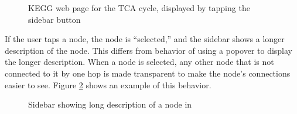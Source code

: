 \begin{figure}[hbtp]
    \caption{\label{fig:kegg_screenshot_kegg_web_site} KEGG web page for the TCA
    cycle, displayed by tapping the sidebar button}
\end{figure}

If the user taps a node, the node is ``selected,'' and the sidebar shows a
longer description of the node.  This differs from \mawappp behavior of using
a popover to display the longer description. When a node is selected, any other
node that is not connected to it by one hop is made transparent to make the
node's connections easier to see.  Figure
\ref{fig:kegg_screenshot_selection_no_info} shows an example of this behavior.

\begin{figure}[hbtp]
    \caption{\label{fig:kegg_screenshot_selection_no_info} Sidebar showing
    long description of a node in \keggapp}
\end{figure}

